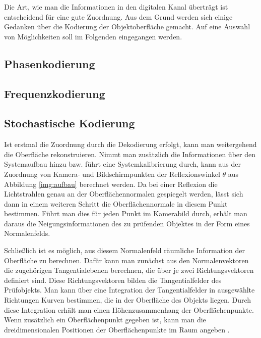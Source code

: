 \noindent
Die Art, wie man die Informationen in den digitalen Kanal überträgt ist entscheidend für eine gute Zuordnung.
Aus dem Grund werden sich einige Gedanken über die Kodierung der Objektoberfläche gemacht.
Auf eine Auswahl von Möglichkeiten soll im Folgenden eingegangen werden.
%
{
	\FloatBarrier
    \subsection{Phasenkodierung}
    \label{sub:phasenKodierung}
    
}
%
{
	\FloatBarrier
    \subsection{Frequenzkodierung}
    \label{sub:frequenzKodierung}
    
}
%
{
	\FloatBarrier
    \subsection{Stochastische Kodierung}
    \label{sub:stochastischeKodierung}
    
}
%
\p
Ist erstmal die Zuordnung durch die Dekodierung erfolgt, kann man weitergehend die Oberfläche rekonstruieren.
Nimmt man zusätzlich die Informationen über den Systemaufbau hinzu bzw. führt eine Systemkalibrierung durch, kann aus der Zuordnung von Kamera- und Bildschirmpunkten der Reflexionswinkel $\theta$ aus Abbildung \ref{img:aufbau} berechnet werden.
Da bei einer Reflexion die Lichtstrahlen genau an der Oberflächennormalen gespiegelt werden, lässt sich dann in einem weiteren Schritt die Oberflächennormale in diesem Punkt bestimmen.
Führt man dies für jeden Punkt im Kamerabild durch, erhält man daraus die Neigungsinformationen des zu prüfenden Objektes in der Form eines Normalenfelds.

\p
Schließlich ist es möglich, aus diesem Normalenfeld räumliche Information der Oberfläche zu berechnen.
Dafür kann man zunächst aus den Normalenvektoren die zugehörigen Tangentialebenen berechnen, die über je zwei Richtungsvektoren definiert sind.
Diese Richtungsvektoren bilden die Tangentialfelder des Prüfobjekts.
Man kann über eine Integration der Tangentialfelder in ausgewählte Richtungen Kurven bestimmen, die in der Oberfläche des Objekts liegen.
Durch diese Integration erhält man einen Höhenzusammen\-hang der Oberflächenpunkte.
Wenn zusätzlich ein Oberflächenpunkt gegeben ist, kann man die dreidimensionalen Positionen der Oberflächenpunkte im Raum angeben \cite{kit_werling}.